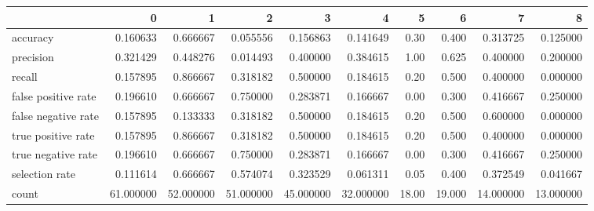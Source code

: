 \begin{tabular}{lrrrrrrrrr}
\toprule
{} &          0 &          1 &          2 &          3 &          4 &      5 &       6 &          7 &          8 \\
\midrule
accuracy            &   0.160633 &   0.666667 &   0.055556 &   0.156863 &   0.141649 &   0.30 &   0.400 &   0.313725 &   0.125000 \\
precision           &   0.321429 &   0.448276 &   0.014493 &   0.400000 &   0.384615 &   1.00 &   0.625 &   0.400000 &   0.200000 \\
recall              &   0.157895 &   0.866667 &   0.318182 &   0.500000 &   0.184615 &   0.20 &   0.500 &   0.400000 &   0.000000 \\
false positive rate &   0.196610 &   0.666667 &   0.750000 &   0.283871 &   0.166667 &   0.00 &   0.300 &   0.416667 &   0.250000 \\
false negative rate &   0.157895 &   0.133333 &   0.318182 &   0.500000 &   0.184615 &   0.20 &   0.500 &   0.600000 &   0.000000 \\
true positive rate  &   0.157895 &   0.866667 &   0.318182 &   0.500000 &   0.184615 &   0.20 &   0.500 &   0.400000 &   0.000000 \\
true negative rate  &   0.196610 &   0.666667 &   0.750000 &   0.283871 &   0.166667 &   0.00 &   0.300 &   0.416667 &   0.250000 \\
selection rate      &   0.111614 &   0.666667 &   0.574074 &   0.323529 &   0.061311 &   0.05 &   0.400 &   0.372549 &   0.041667 \\
count               &  61.000000 &  52.000000 &  51.000000 &  45.000000 &  32.000000 &  18.00 &  19.000 &  14.000000 &  13.000000 \\
\bottomrule
\end{tabular}

